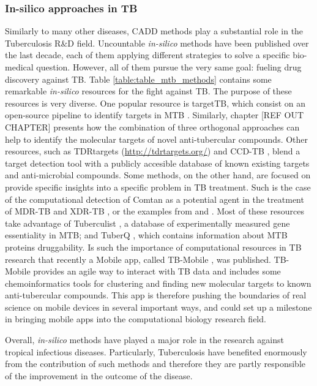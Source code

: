 \documentclass[12pt, b5paper,twoside]{tesi_upf}
\begin{document}
\subsubsection{In-silico approaches in TB}

\par Similarly to many other diseases, CADD methods play a substantial role in the Tuberculosis R$\&$D field. Uncountable \textit{in-silico} methods have been published over the last decade, each of them applying different strategies to solve a specific bio-medical question. However, all of them pursue the very same goal: fueling drug discovery against TB. Table \ref{table:table_mtb_methods} contains some remarkable \textit{in-silico} resources for the fight
against TB. The purpose of these resources is very diverse. One popular resource is targetTB, which consist on an open-source pipeline to identify targets in MTB \cite{Raman2008a}. Similarly, chapter [REF OUT CHAPTER] presents how the combination of three orthogonal approaches can help to identify the molecular targets of novel anti-tubercular compounds. Other resources, such as TDRtargets \cite{Crowther2010} (\url{http://tdrtargets.org/}) and CCD-TB \cite{Ekins2010},  blend a target detection tool with a publicly accesible database of known existing targets and anti-microbial compounds. Some methods, on the other hand,  are focused on provide specific insights into a specific problem in TB treatment. Such is the case of the computational detection of Comtan as a potential agent in the treatment of MDR-TB and XDR-TB \cite{Kinnings2009}, or the examples from \cite{DeJonge2007} and \cite{Kumar2009}. Most of these resources take advantage of Tuberculist \cite{Lew2011}, a database of experimentally measured gene essentiality in MTB; and TuberQ \cite{Radusky2014} , which contains information about MTB proteins druggability. Is such the importance of computational resources in TB research that recently a Mobile app, called TB-Mobile \cite{Ekins2013, Clark2014}, was published. TB-Mobile provides an agile way to interact with TB data and includes some chemoinformatics tools for clustering and finding new molecular targets to known anti-tubercular compounds. This app is therefore pushing the boundaries of real science on mobile devices in several important ways, and could set up a milestone in bringing mobile apps into the computational biology research field.

\par Overall, \textit{in-silico} methods have played a major role in the research against tropical infectious diseases. Particularly,  Tuberculosis have benefited enormously from the contribution of such methods and therefore they are partly responsible of the improvement in the outcome of the disease. 
\end{document}
